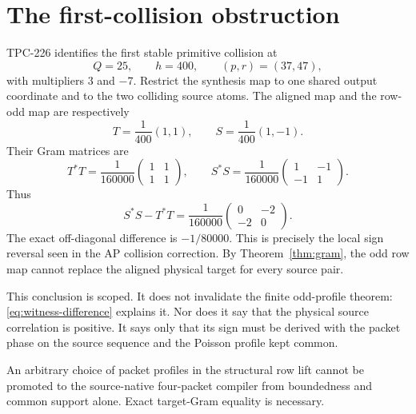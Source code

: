 \section{The first-collision obstruction}

TPC-226 identifies the first stable primitive collision at
\[
 Q=25,\qquad h=400,\qquad (p,r)=(37,47),
\]
with multipliers $3$ and $-7$.  Restrict the synthesis map to one shared output
coordinate and to the two colliding source atoms.  The aligned map and the row-odd map
are respectively
\[
 T=\frac1{400}(1,1),\qquad S=\frac1{400}(1,-1).
\]
Their Gram matrices are
\begin{equation}
 T^*T=\frac1{160000}\begin{pmatrix}1&1\\1&1\end{pmatrix},\qquad
 S^*S=\frac1{160000}\begin{pmatrix}1&-1\\-1&1\end{pmatrix}.
 \label{eq:witness-grams}
\end{equation}
Thus
\begin{equation}
 S^*S-T^*T=\frac1{160000}\begin{pmatrix}0&-2\\-2&0\end{pmatrix}.
 \label{eq:witness-difference}
\end{equation}
The exact off-diagonal difference is $-1/80000$.  This is precisely the local sign
reversal seen in the AP collision correction.  By Theorem~\ref{thm:gram}, the odd row
map cannot replace the aligned physical target for every source pair.

This conclusion is scoped.  It does not invalidate the finite odd-profile theorem:
\eqref{eq:witness-difference} explains it.  Nor does it say that the physical source
correlation is positive.  It says only that its sign must be derived with the packet
phase on the source sequence and the Poisson profile kept common.

\begin{corollary}
An arbitrary choice of packet profiles in the structural row lift cannot be promoted to
the source-native four-packet compiler from boundedness and common support alone.
Exact target-Gram equality is necessary.
\end{corollary}
